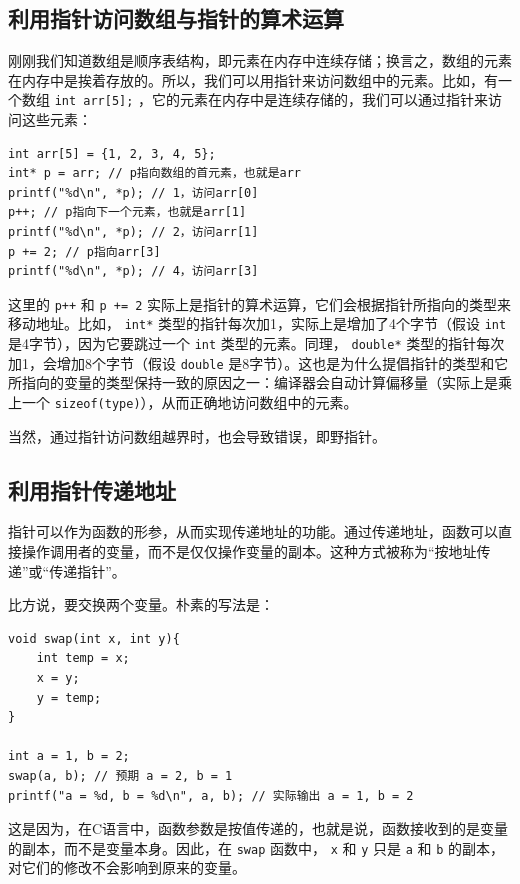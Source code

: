 \subsection{利用指针访问数组与指针的算术运算}

刚刚我们知道数组是顺序表结构，即元素在内存中连续存储；换言之，数组的元素在内存中是挨着存放的。所以，我们可以用指针来访问数组中的元素。比如，有一个数组 \verb|int arr[5];| ，它的元素在内存中是连续存储的，我们可以通过指针来访问这些元素：

\begin{verbatim}
int arr[5] = {1, 2, 3, 4, 5};
int* p = arr; // p指向数组的首元素，也就是arr
printf("%d\n", *p); // 1，访问arr[0]
p++; // p指向下一个元素，也就是arr[1]
printf("%d\n", *p); // 2，访问arr[1]
p += 2; // p指向arr[3]
printf("%d\n", *p); // 4，访问arr[3]
\end{verbatim}

这里的 \verb|p++| 和 \verb|p += 2| 实际上是指针的算术运算，它们会根据指针所指向的类型来移动地址。比如， \verb|int*| 类型的指针每次加1，实际上是增加了4个字节（假设 \verb|int| 是4字节），因为它要跳过一个 \verb|int| 类型的元素。同理， \verb|double*| 类型的指针每次加1，会增加8个字节（假设 \verb|double| 是8字节）。这也是为什么提倡指针的类型和它所指向的变量的类型保持一致的原因之一：编译器会自动计算偏移量（实际上是乘上一个 \texttt{sizeof(type)}），从而正确地访问数组中的元素。

当然，通过指针访问数组越界时，也会导致错误，即野指针。

\subsection{利用指针传递地址}

指针可以作为函数的形参，从而实现传递地址的功能。通过传递地址，函数可以直接操作调用者的变量，而不是仅仅操作变量的副本。这种方式被称为“按地址传递”或“传递指针”。

比方说，要交换两个变量。朴素的写法是：
\begin{verbatim}
void swap(int x, int y){
    int temp = x;
    x = y;
    y = temp;
}

int a = 1, b = 2;
swap(a, b); // 预期 a = 2, b = 1
printf("a = %d, b = %d\n", a, b); // 实际输出 a = 1, b = 2 
\end{verbatim}
这是因为，在C语言中，函数参数是按值传递的，也就是说，函数接收到的是变量的副本，而不是变量本身。因此，在 \verb|swap| 函数中， \verb|x| 和 \verb|y| 只是 \verb|a| 和 \verb|b| 的副本，对它们的修改不会影响到原来的变量。

